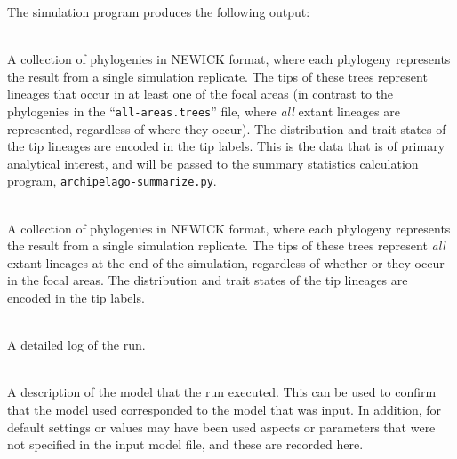 \documentclass[11pt,openany]{memoir} %
\let\Item\item
\newcommand\SpecialItem{\renewcommand\item[1][]{\Item[\textbullet~\bfseries##1]}}
\begin{document}
The simulation program produces the following output:
\begin{description}
    \SpecialItem
        \item[\texttt{<OUTPUT-PREFIX>.focal-areas.trees}] \hfill \\
            A collection of phylogenies in NEWICK format, where each phylogeny represents the result from a single simulation replicate.
            The tips of these trees represent lineages that occur in at least one of the focal areas (in contrast to the phylogenies in the ``\texttt{all-areas.trees}'' file, where \textit{all} extant lineages are represented, regardless of where they occur).
            The distribution and trait states of the tip lineages are encoded in the tip labels.
            This is the data that is of primary analytical interest, and will be passed to the summary statistics calculation program, \texttt{archipelago-summarize.py}.
        \item[\texttt{<OUTPUT-PREFIX>.all-areas.trees}] \hfill \\
            A collection of phylogenies in NEWICK format, where each phylogeny represents the result from a single simulation replicate.
            The tips of these trees represent \textit{all} extant lineages at the end of the simulation, regardless of whether or they occur in the focal areas.
            The distribution and trait states of the tip lineages are encoded in the tip labels.
        \item[\texttt{<OUTPUT-PREFIX>.log}] \hfill \\
            A detailed log of the run.
        \item[\texttt{<OUTPUT-PREFIX>.model.json}] \hfill \\
            A description of the model that the run executed. This can be used to confirm that the model used corresponded to the model that was input. In addition, for default settings or values may have been used aspects or parameters that were not specified in the input model file, and these are recorded here.
\end{description}
\end{document}
